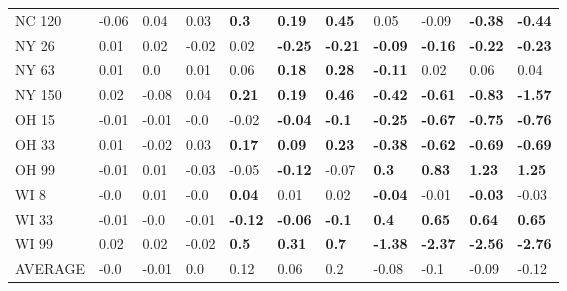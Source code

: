 \begin{tabular}{lllllllllll}
NC 120  &   -0.06 &            0.04 &            0.03 &    \textbf{0.3} &   \textbf{0.19} &   \textbf{0.45} &            0.05 &           -0.09 &  \textbf{-0.38} &  \textbf{-0.44} \\
NY 26   &    0.01 &            0.02 &           -0.02 &            0.02 &  \textbf{-0.25} &  \textbf{-0.21} &  \textbf{-0.09} &  \textbf{-0.16} &  \textbf{-0.22} &  \textbf{-0.23} \\
NY 63   &    0.01 &             0.0 &            0.01 &            0.06 &   \textbf{0.18} &   \textbf{0.28} &  \textbf{-0.11} &            0.02 &            0.06 &            0.04 \\
NY 150  &    0.02 &           -0.08 &            0.04 &   \textbf{0.21} &   \textbf{0.19} &   \textbf{0.46} &  \textbf{-0.42} &  \textbf{-0.61} &  \textbf{-0.83} &  \textbf{-1.57} \\
OH 15   &   -0.01 &           -0.01 &            -0.0 &           -0.02 &  \textbf{-0.04} &   \textbf{-0.1} &  \textbf{-0.25} &  \textbf{-0.67} &  \textbf{-0.75} &  \textbf{-0.76} \\
OH 33   &    0.01 &           -0.02 &            0.03 &   \textbf{0.17} &   \textbf{0.09} &   \textbf{0.23} &  \textbf{-0.38} &  \textbf{-0.62} &  \textbf{-0.69} &  \textbf{-0.69} \\
OH 99   &   -0.01 &            0.01 &           -0.03 &           -0.05 &  \textbf{-0.12} &           -0.07 &    \textbf{0.3} &   \textbf{0.83} &   \textbf{1.23} &   \textbf{1.25} \\
WI 8    &    -0.0 &            0.01 &            -0.0 &   \textbf{0.04} &            0.01 &            0.02 &  \textbf{-0.04} &           -0.01 &  \textbf{-0.03} &           -0.03 \\
WI 33   &   -0.01 &            -0.0 &           -0.01 &  \textbf{-0.12} &  \textbf{-0.06} &   \textbf{-0.1} &    \textbf{0.4} &   \textbf{0.65} &   \textbf{0.64} &   \textbf{0.65} \\
WI 99   &    0.02 &            0.02 &           -0.02 &    \textbf{0.5} &   \textbf{0.31} &    \textbf{0.7} &  \textbf{-1.38} &  \textbf{-2.37} &  \textbf{-2.56} &  \textbf{-2.76} \\
AVERAGE &    -0.0 &           -0.01 &             0.0 &            0.12 &            0.06 &             0.2 &           -0.08 &            -0.1 &           -0.09 &           -0.12 \\
\bottomrule
\end{tabular}
